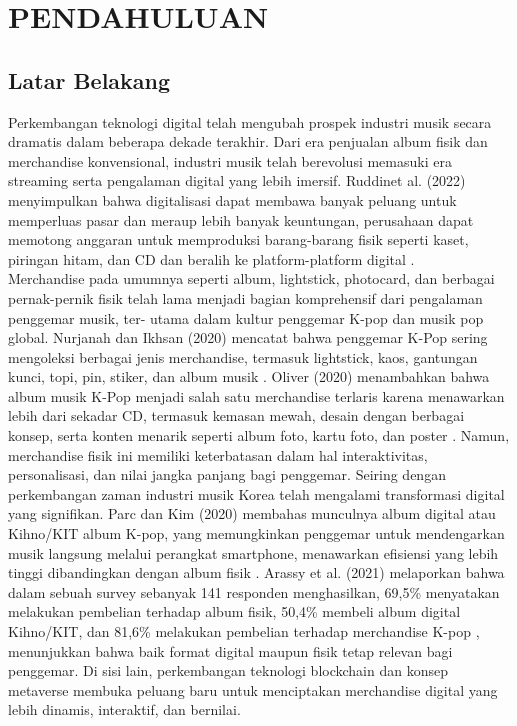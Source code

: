 \chapter{PENDAHULUAN}

\section{Latar Belakang}

Perkembangan teknologi digital telah mengubah prospek industri musik secara dramatis dalam beberapa dekade terakhir. 
Dari era penjualan album fisik dan merchandise konvensional, industri musik telah berevolusi memasuki era streaming 
serta pengalaman digital yang lebih imersif. Ruddinet al. (2022) menyimpulkan bahwa digitalisasi dapat membawa banyak
peluang untuk memperluas pasar dan meraup lebih banyak keuntungan, perusahaan dapat memotong anggaran untuk memproduksi
barang-barang fisik seperti kaset, piringan hitam, dan CD dan beralih ke platform-platform digital \parencite{Ruddin2022}.
\\

Merchandise pada umumnya seperti album, lightstick, photocard, dan berbagai pernak-pernik fisik telah lama menjadi bagian
komprehensif dari pengalaman penggemar musik, ter- utama dalam kultur penggemar K-pop dan musik pop global. Nurjanah dan
Ikhsan (2020) mencatat bahwa penggemar K-Pop sering mengoleksi berbagai jenis merchandise, termasuk lightstick, kaos,
gantungan kunci, topi, pin, stiker, dan album musik \parencite{Nurjanah2020}. Oliver (2020) menambahkan bahwa album musik K-Pop menjadi 
salah satu merchandise terlaris karena menawarkan lebih dari sekadar CD, termasuk kemasan mewah, desain dengan berbagai
konsep, serta konten menarik seperti album foto, kartu foto, dan poster \parencite{Oliver2020}. Namun, merchandise fisik ini memiliki 
keterbatasan dalam hal interaktivitas, personalisasi, dan nilai jangka panjang bagi penggemar. Seiring dengan perkembangan
zaman industri musik Korea telah mengalami transformasi digital yang signifikan. Parc dan Kim (2020) membahas 
munculnya album digital atau Kihno/KIT album K-pop, yang memungkinkan penggemar untuk mendengarkan musik langsung melalui
perangkat smartphone, menawarkan efisiensi yang lebih tinggi dibandingkan dengan album fisik \parencite{Arassy2021}. Arassy et al. (2021)
melaporkan bahwa dalam sebuah survey sebanyak 141 responden menghasilkan, 69,5\% menyatakan melakukan pembelian terhadap
album fisik, 50,4\% membeli album digital Kihno/KIT, dan 81,6\% melakukan pembelian terhadap merchandise K-pop \parencite{Saputera2024},
menunjukkan bahwa baik format digital maupun fisik tetap relevan bagi penggemar. Di sisi lain, perkembangan teknologi
blockchain dan konsep metaverse membuka peluang baru untuk menciptakan merchandise digital yang lebih dinamis, interaktif,
dan bernilai.
\\

